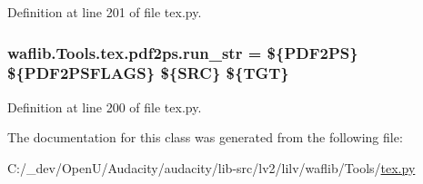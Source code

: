 Definition at line 201 of file tex.\+py.

\subsubsection[{\texorpdfstring{run\+\_\+str}{run_str}}]{ waflib.\+Tools.\+tex.\+pdf2ps.\+run\+\_\+str = \textquotesingle{}\$\{P\+D\+F2\+PS\} \$\{P\+D\+F2\+P\+S\+F\+L\+A\+GS\} \$\{S\+RC\} \$\{T\+GT\}\textquotesingle{}\hspace{0.3cm}{\ttfamily [static]}}\hypertarget{classwaflib_1_1_tools_1_1tex_1_1pdf2ps_ac4694d84ae08bec5367c7c83c8aa2a33}{}\label{classwaflib_1_1_tools_1_1tex_1_1pdf2ps_ac4694d84ae08bec5367c7c83c8aa2a33}


Definition at line 200 of file tex.\+py.



The documentation for this class was generated from the following file\+:\begin{DoxyCompactItemize}
\item 
C\+:/\+\_\+dev/\+Open\+U/\+Audacity/audacity/lib-\/src/lv2/lilv/waflib/\+Tools/\hyperlink{lilv_2waflib_2_tools_2tex_8py}{tex.\+py}\end{DoxyCompactItemize}
